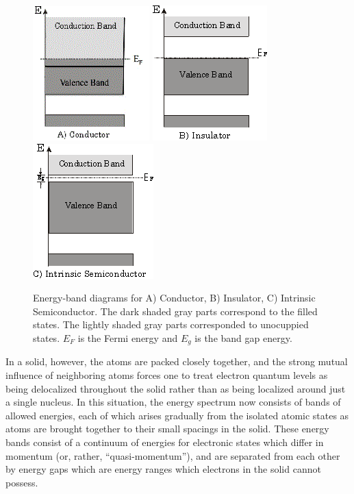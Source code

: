\documentclass{../lab}
\begin{document}
\begin{figure}[h]
    \centering
    \href{http://experimentationlab.berkeley.edu/sites/default/files/images/SHEimage016.gif}{\includegraphics[width=0.25\linewidth,keepaspectratio]{images/SHEimage016.png}}
    \href{http://experimentationlab.berkeley.edu/sites/default/files/images/SHEimage017.gif}{\includegraphics[width=0.25\linewidth,keepaspectratio]{images/SHEimage017.png}}
    \href{http://experimentationlab.berkeley.edu/sites/default/files/images/SHEimage018.gif}{\includegraphics[width=0.25\linewidth,keepaspectratio]{images/SHEimage018.png}}
    \caption{Energy-band diagrams for A) Conductor, B) Insulator, C) Intrinsic Semiconductor. The dark shaded gray parts correspond to the filled states. The lightly shaded gray parts corresponded to unocuppied states. $E_F$ is the Fermi energy and $E_g$ is the band gap energy.}
    \label{fig:EnergyBandDiagrams}
\end{figure}

In a solid, however, the atoms are packed closely together, and the strong mutual influence of neighboring atoms forces one to treat electron quantum levels as being delocalized throughout the solid rather than as being localized around just a single nucleus. In this situation, the energy spectrum now consists of bands of allowed energies, each of which arises gradually from the isolated atomic states as atoms are brought together to their small spacings in the solid. These energy bands consist of a continuum of energies for electronic states which differ in momentum (or, rather, ``quasi-momentum''), and are separated from each other by energy gaps which are energy ranges which electrons in the solid cannot possess.
\end{document}
